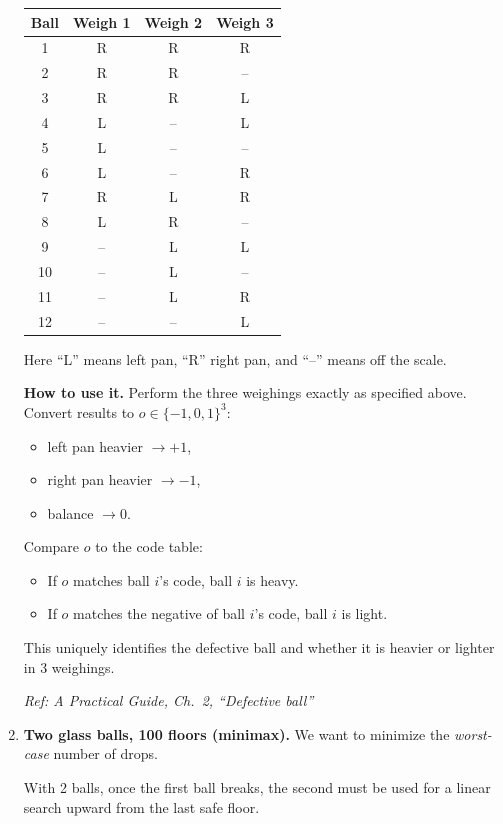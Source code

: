 \documentclass[11pt]{article}
\begin{document}
\begin{enumerate}[label=\textbf{\arabic*.}]
\begin{center}
\begin{tabular}{c|ccc}
Ball & Weigh 1 & Weigh 2 & Weigh 3\\
\hline
1  & R & R & R\\
2  & R & R & --\\
3  & R & R & L\\
4  & L & --& L\\
5  & L & --& --\\
6  & L & --& R\\
7  & R & L & R\\
8  & L & R & --\\
9  & --& L & L\\
10 & --& L & --\\
11 & --& L & R\\
12 & --& --& L\\
\end{tabular}
\end{center}

Here ``L'' means left pan, ``R'' right pan, and ``--'' means off the scale.

\medskip
\noindent\textbf{How to use it.}
Perform the three weighings exactly as specified above. Convert results to \(o\in\{-1,0,1\}^3\):
\begin{itemize}
\item left pan heavier $\to +1$,
\item right pan heavier $\to -1$,
\item balance $\to 0$.
\end{itemize}
Compare \(o\) to the code table:
\begin{itemize}
\item If \(o\) matches ball \(i\)'s code, ball \(i\) is heavy.
\item If \(o\) matches the negative of ball \(i\)'s code, ball \(i\) is light.
\end{itemize}

This uniquely identifies the defective ball and whether it is heavier or lighter in \(\boxed{3}\) weighings.

\hfill{\small\textit{Ref: A Practical Guide, Ch.\ 2, ``Defective ball''}}

\item \textbf{Two glass balls, 100 floors (minimax).}
We want to minimize the \emph{worst-case} number of drops.

With 2 balls, once the first ball breaks, the second must be used for a linear search upward from the last safe floor.


\end{enumerate}
\end{document}
